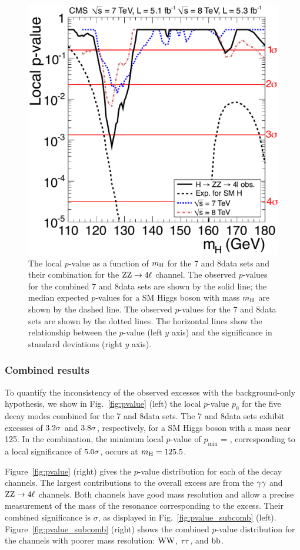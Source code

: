 \documentclass[12pt,twoside,a4paper,cmspaper,final,collab]{cms-tdr}
\begin{document}
\begin{figure}[htbp]
  \begin{center}
    \includegraphics[width=0.49\linewidth]{figures/HZZ_pValue_small}
    \caption{The local $p$-value as a function of $m_{\mathrm{H}}$ for the 7 and 8\TeV data sets and their combination
     for the $\mathrm{Z}\mathrm{Z} \to 4\ell$ channel.
     The observed $p$-values  for the combined 7 and 8\TeV data sets are shown by the solid line;
     the median expected $p$-values for a SM Higgs boson with mass $m_{\mathrm{H}}$ are shown by the dashed line.
     The observed $p$-values for the 7 and 8\TeV data sets are shown by the dotted lines.
     The horizontal lines show the relationship between the $p$-value (left $y$ axis) and
     the significance in standard deviations (right $y$ axis).
     }
   \label{fig:PValue}
  \end{center}
\end{figure}



\subsubsection{Combined results}


To quantify the inconsistency of the observed excesses with the background-only hypothesis,
we show in Fig.~\ref{fig:pvalue} (left) the
local $p$-value $p_0$ for the five decay modes combined for the 7 and 8\TeV data sets.
The 7 and 8\TeV data sets
exhibit excesses of $3.2 \sigma$ and ${\relax3.8}  \sigma$, respectively,
for a SM Higgs boson with a mass near {\color{black}125}\GeV.
In the combination, the minimum local $p$-value of $p_{\min}$ = \MinLocalP ,
corresponding to a local significance of ${\relax5.0}  \sigma$, occurs at $m_{\mathrm{H}} = 125.5$\GeV.

Figure~\ref{fig:pvalue} (right) gives the $p$-value distribution for each of the
decay channels. The largest contributions to the overall excess
are from the  $\gamma\gamma$ and $\mathrm{Z}\mathrm{Z} \to 4\ell$ channels. Both channels have good
mass resolution and allow a precise measurement of the mass of
the resonance corresponding to the excess. Their combined
significance is \ZhighRes$\sigma$, as displayed in Fig.~\ref{fig:pvalue_subcomb} (left).
Figure~\ref{fig:pvalue_subcomb} (right) shows the combined $p$-value distribution for the channels
with poorer mass resolution: $\mathrm{W}\mathrm{W}$, $\tau\tau$, and $\mathrm{b}\mathrm{b}$.
\end{document}
